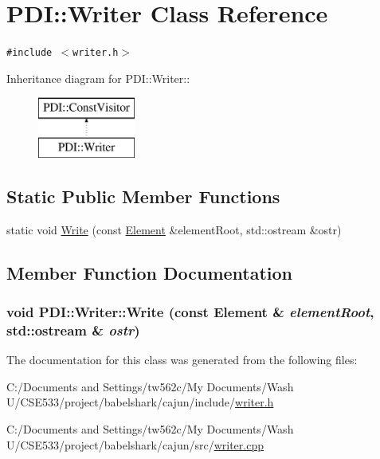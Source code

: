 \hypertarget{class_p_d_i_1_1_writer}{
\section{PDI::Writer Class Reference}
\label{class_p_d_i_1_1_writer}
}
{\tt \#include $<$writer.h$>$}

Inheritance diagram for PDI::Writer::\begin{figure}[H]
\begin{center}
\leavevmode
\includegraphics[height=2cm]{class_p_d_i_1_1_writer}
\end{center}
\end{figure}
\subsection*{Static Public Member Functions}
\begin{CompactItemize}
\item 
static void \hyperlink{class_p_d_i_1_1_writer_eef189e1db87e99ffcd31f7d197df415}{Write} (const \hyperlink{class_p_d_i_1_1_element}{Element} \&elementRoot, std::ostream \&ostr)
\end{CompactItemize}


\subsection{Member Function Documentation}
\hypertarget{class_p_d_i_1_1_writer_eef189e1db87e99ffcd31f7d197df415}{
\subsubsection[{Write}]{\setlength{\rightskip}{0pt plus 5cm}void PDI::Writer::Write (const {\bf Element} \& {\em elementRoot}, \/  std::ostream \& {\em ostr})}}
\label{class_p_d_i_1_1_writer_eef189e1db87e99ffcd31f7d197df415}




The documentation for this class was generated from the following files:\begin{CompactItemize}
\item 
C:/Documents and Settings/tw562c/My Documents/Wash U/CSE533/project/babelshark/cajun/include/\hyperlink{writer_8h}{writer.h}\item 
C:/Documents and Settings/tw562c/My Documents/Wash U/CSE533/project/babelshark/cajun/src/\hyperlink{writer_8cpp}{writer.cpp}\end{CompactItemize}
